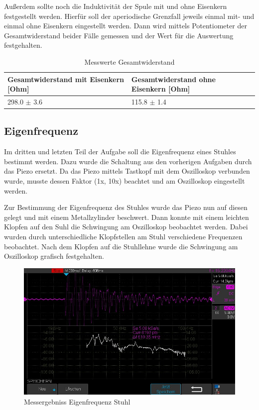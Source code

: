\documentclass[12pt,a4paper,twoside]{article}
\begin{document}
\noindent
Außerdem sollte noch die Induktivität der Spule mit und ohne Eisenkern festgestellt werden. Hierfür soll der aperiodische Grenzfall jeweils einmal mit- und einmal ohne Eisenkern eingestellt werden. 
Dann wird mittels Potentiometer der Gesamtwiderstand beider Fälle gemessen und der Wert für die Auswertung festgehalten.

\begin{table}[H]
    \centering
    \caption{Messwerte Gesamtwiderstand}
    \label{tab:messwerteGesamtwiderstand}
    \begin{tabular}{| l | l |}
        \hline
        Gesamtwiderstand mit Eisenkern [Ohm]  & Gesamtwiderstand ohne Eisenkern [Ohm] \\
        \hline
        298.0 $\pm$ 3.6 & 115.8 $\pm$ 1.4 \\
        \hline
    \end{tabular}
\end{table}


\subsection{Eigenfrequenz}

Im dritten und letzten Teil der Aufgabe soll die Eigenfrequenz eines Stuhles bestimmt werden. Dazu wurde die Schaltung aus den vorherigen Aufgaben durch das Piezo ersetzt.
Da das Piezo mittels Tastkopf mit dem Oszilloskop verbunden wurde, musste dessen Faktor (1x, 10x) beachtet und am Oszilloskop eingestellt werden. \newline

\noindent
Zur Bestimmung der Eigenfrequenz des Stuhles wurde das Piezo nun auf diesen gelegt und mit einem Metallzylinder beschwert. Dann konnte mit einem leichten Klopfen auf den Suhl die Schwingung am Oszilloskop beobachtet werden. 
Dabei wurden durch unterschiedliche Klopfstellen am Stuhl verschiedene Frequenzen beobachtet. Nach dem Klopfen auf die Stuhllehne wurde die Schwingung am Oszilloskop grafisch festgehalten.

\begin{figure}[H]
    \centering
    \includegraphics[width=0.6\linewidth, angle=0]{Messergebnisse/3.4EigenfrequenzStuhl/EigenfrequenzStuhl.jpg}
    \caption{Messergebniss Eigenfrequenz Stuhl}
    \label{fig:MessergebnissEigenfrequenzStuhl}
\end{figure}
\end{document}
